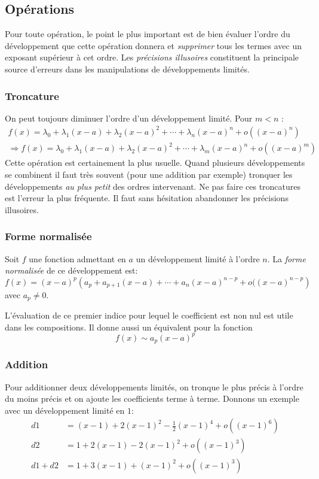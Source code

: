 \subsection{Opérations}
Pour toute opération, le point le plus important est de bien évaluer l'ordre du développement que cette opération donnera et \emph{supprimer} tous les termes avec un exposant supérieur à cet ordre. Les \emph{précisions illusoires} constituent la principale source d'erreurs dans les manipulations de développements limités.
\subsubsection{Troncature}
On peut toujours diminuer l'ordre d'un développement limité. Pour $m<n$ :
\begin{multline*}
 f(x)= \lambda_0 + \lambda_1(x-a)+ \lambda_2(x-a)^2+\cdots+ \lambda_n(x-a)^n+o((x-a)^n)\\
\Rightarrow f(x)= \lambda_0 + \lambda_1(x-a)+ \lambda_2(x-a)^2+\cdots+ \lambda_m(x-a)^n+o((x-a)^m)
\end{multline*}
Cette opération est certainement la plus usuelle. Quand plusieurs développements se combinent il faut très souvent (pour une addition par exemple) tronquer les développements \emph{au plus petit} des ordres intervenant. Ne pas faire ces troncatures est l'erreur la plus fréquente. Il faut sans hésitation abandonner les précisions illusoires.

\subsubsection{Forme normalisée}
\begin{defi}
Soit $f$ une fonction admettant en $a$ un développement limité à l'ordre $n$. La \emph{forme normalisée} de ce développement est:
\begin{displaymath}
f(x) = (x-a)^p\left(a_p + a_{p+1}(x-a)+\cdots + a_{n}(x-a)^{n-p} +o((x-a)^{n-p} \right)   
\end{displaymath}
avec $a_p\neq 0$.
\end{defi}
L'évaluation de ce premier indice pour lequel le coefficient est non nul est utile dans les compositions. Il donne aussi un équivalent pour la fonction
\begin{displaymath}
  f(x) \sim a_p(x-a)^p
\end{displaymath}


\subsubsection{Addition}
Pour additionner deux développements limités, on tronque le plus précis à l'ordre du moins précis et on ajoute les coefficients terme à terme. Donnons un exemple avec un développement limité en $1$:
\begin{align*}
 d1 &= (x-1) + 2(x-1)^2 -\frac{1}{2}(x-1)^4+o((x-1)^6)\\
 d2 &= 1+2(x-1) - 2(x-1)^2 +o((x-1)^3)\\
d1+d2 &= 1 +3(x-1) +(x-1)^2+o((x-1)^3)
\end{align*}

